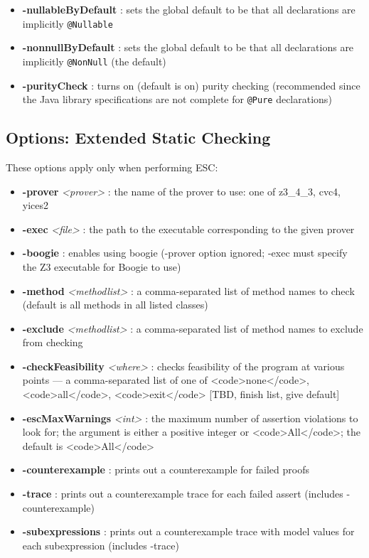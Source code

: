 \documentclass{report}%
\begin{document}
\begin{itemize}
\item \textbf{-nullableByDefault} : sets the global default to be that all declarations are implicitly \texttt{@Nullable}
\item \textbf{-nonnullByDefault} : sets the global default to be that all 
declarations are implicitly \texttt{@NonNull} (the default)
\item \textbf{-purityCheck} : turns on (default is on) purity checking (recommended since the Java library specifications are not complete for \texttt{@Pure} declarations)
\end{itemize}

\subsection{Options: Extended Static Checking}
\label{OptionsESC}

These options apply only when performing ESC:
\begin{itemize}
\item \textbf{-prover} \textit{<prover>} : the name of the prover to use: one of z3\_4\_3, cvc4, yices2
\item \textbf{-exec} \textit{<file>} : the path to the executable corresponding to the given prover
\item \textbf{-boogie} : enables using boogie (-prover option ignored; -exec must specify the Z3 executable for Boogie to use)
\item \textbf{-method} \textit{<methodlist>} : a comma-separated list of method names to
check (default is all methods in all listed classes)
\item \textbf{-exclude} \textit{<methodlist>} : a comma-separated list of method names to exclude from checking
\item \textbf{-checkFeasibility} \textit{<where>} : checks feasibility of the program at various points --- a comma-separated list of
one of <code>none</code>, <code>all</code>, <code>exit</code> [TBD, finish list,  give default]
\item \textbf{-escMaxWarnings} \textit{<int>} : the maximum number of assertion violations to look for; the argument is either a positive integer or <code>All</code>; the default is <code>All</code>
\item \textbf{-counterexample} : prints out a counterexample for failed proofs
\item \textbf{-trace} : prints out a counterexample trace for each failed assert (includes -counterexample)
\item \textbf{-subexpressions} : prints out a counterexample trace with model values for each subexpression (includes -trace)
\end{itemize}
\end{document}
